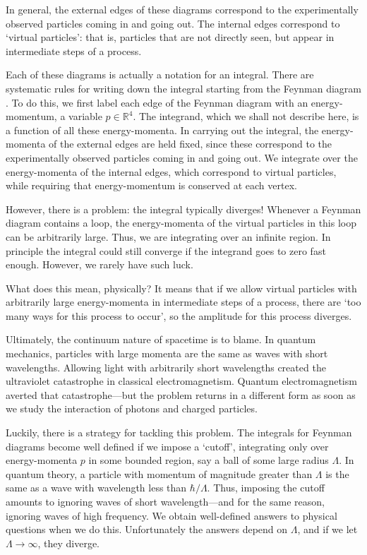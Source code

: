 \documentclass[12pt]{article}
\newcommand{\R}{\mathbb{R}}
\begin{document}
In general, the external edges of these diagrams correspond to the experimentally observed particles coming in and going out.  The internal edges correspond to `virtual particles': that is, particles that are not directly seen, but appear in intermediate steps of a process.

Each of these diagrams is actually a notation for an integral. There are systematic rules for writing down the integral starting from the Feynman diagram \cite{IZ,PS}.  To do this, we first label each edge of the Feynman diagram with an energy-momentum, a variable $p \in \R^4$.   The integrand, which we shall not describe here, is a function of all these energy-momenta.  In carrying out the integral, the energy-momenta of the external edges are held fixed, since these correspond to the experimentally observed particles coming in and going out.  We integrate over the energy-momenta of the internal edges, which correspond to virtual particles, while requiring that energy-momentum is conserved at each vertex.  

However, there is a problem: the integral typically diverges!  Whenever a Feynman diagram contains a loop, the energy-momenta of the virtual particles in this loop can be arbitrarily large.  Thus, we are integrating over an infinite region.  In principle the integral could still converge if the integrand goes to zero fast enough.   However, we rarely have such luck.

What does this mean, physically?  It means that if we allow virtual particles with arbitrarily large energy-momenta in intermediate steps of a process, there are `too many ways for this process to occur', so the amplitude for this process diverges.  

Ultimately, the continuum nature of spacetime is to blame.  In quantum mechanics, particles with large momenta are the same as waves with short wavelengths.   Allowing light with arbitrarily short wavelengths created the ultraviolet catastrophe in classical electromagnetism.  Quantum electromagnetism averted that catastrophe---but the problem returns in a different form as soon as we study the interaction of photons and charged particles.

Luckily, there is a strategy for tackling this problem. The integrals for Feynman diagrams become well defined if we impose a `cutoff', integrating only over energy-momenta $p$ in some bounded region, say a ball of some large radius $\Lambda$.   In quantum theory, a particle with momentum of magnitude greater than $\Lambda$ is the same as a wave with wavelength less than $\hbar/\Lambda$.    Thus, imposing the cutoff amounts to ignoring waves of short wavelength---and for the same reason, ignoring waves of high frequency.   We obtain well-defined answers to physical questions when we do this.  Unfortunately the answers depend on $\Lambda$, and if we let $\Lambda \to \infty$, they diverge.
\end{document}
